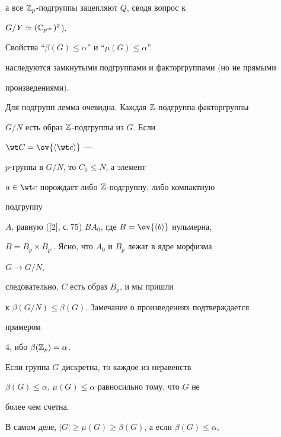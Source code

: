 а все $\Bbb Z_p$-подгруппы зацепляют $Q$, сводя вопрос к 


$G/Y\simeq(\Bbb C_{p^\infty})^2$). 


 


\begin{lem} 


Свойства ``$\beta(G)\le\alpha$'' и ``$\mu(G)\le\alpha$'' 


наследуются замкнутыми подгруппами и факторгруппами $($но не прямыми 


произведениями$)$. 


\end{lem} 


 


Для подгрупп лемма очевидна. Каждая $\Bbb Z$-подгруппа факторгруппы 


$G/N$ есть образ $\Bbb Z$-подгруппы из $G$. Если 


$\wt C=\ov{\la\wt c\ra}$ --- 


$p$-группа в $G/N$, то $C_0\le N$, а элемент 


$a\in\wt c$ порождает либо $\Bbb Z$-подгруппу, либо компактную 


подгруппу 


$A$, равную ([2], с.\,75) $BA_0$, где $B=\ov{\la b\ra}$ нульмерна, 


$B=B_p\times B_{p'}$. Ясно, что $A_0$ и $B_p$ лежат в ядре морфизма 


$G\to G/N$, 


следовательно, $C$ есть образ $B_p$, и мы пришли  


к $\beta(G/N)\le\beta(G)$. Замечание о произведениях подтверждается 


примером 


4, ибо $\beta(\Bbb Z_p)=\alpha$. 


 


\begin{lem} 


Если группа $G$ дискретна, то каждое из неравенств 


$\beta(G)\le\alpha$, $\mu(G)\le\alpha$ равносильно тому, что $G$ не  


более чем счетна. 


\end{lem} 


 


В самом деле, $|G|\ge\mu(G)\ge\beta(G)$, а если $\beta(G)\le\alpha$, 


